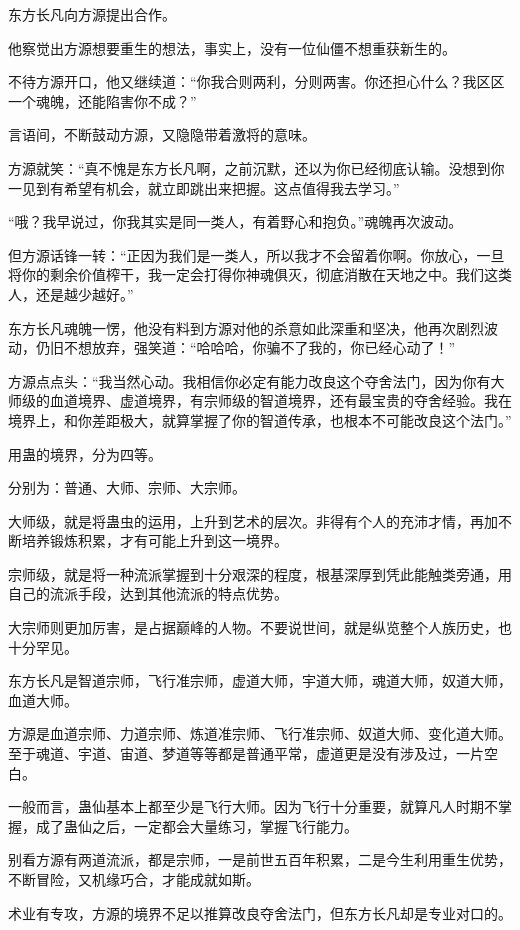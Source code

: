 \begin{this_body}
东方长凡向方源提出合作。

他察觉出方源想要重生的想法，事实上，没有一位仙僵不想重获新生的。

不待方源开口，他又继续道：“你我合则两利，分则两害。你还担心什么？我区区一个魂魄，还能陷害你不成？”

言语间，不断鼓动方源，又隐隐带着激将的意味。

方源就笑：“真不愧是东方长凡啊，之前沉默，还以为你已经彻底认输。没想到你一见到有希望有机会，就立即跳出来把握。这点值得我去学习。”

“哦？我早说过，你我其实是同一类人，有着野心和抱负。”魂魄再次波动。

但方源话锋一转：“正因为我们是一类人，所以我才不会留着你啊。你放心，一旦将你的剩余价值榨干，我一定会打得你神魂俱灭，彻底消散在天地之中。我们这类人，还是越少越好。”

东方长凡魂魄一愣，他没有料到方源对他的杀意如此深重和坚决，他再次剧烈波动，仍旧不想放弃，强笑道：“哈哈哈，你骗不了我的，你已经心动了！”

方源点点头：“我当然心动。我相信你必定有能力改良这个夺舍法门，因为你有大师级的血道境界、虚道境界，有宗师级的智道境界，还有最宝贵的夺舍经验。我在境界上，和你差距极大，就算掌握了你的智道传承，也根本不可能改良这个法门。”

用蛊的境界，分为四等。

分别为：普通、大师、宗师、大宗师。

大师级，就是将蛊虫的运用，上升到艺术的层次。非得有个人的充沛才情，再加不断培养锻炼积累，才有可能上升到这一境界。

宗师级，就是将一种流派掌握到十分艰深的程度，根基深厚到凭此能触类旁通，用自己的流派手段，达到其他流派的特点优势。

大宗师则更加厉害，是占据巅峰的人物。不要说世间，就是纵览整个人族历史，也十分罕见。

东方长凡是智道宗师，飞行准宗师，虚道大师，宇道大师，魂道大师，奴道大师，血道大师。

方源是血道宗师、力道宗师、炼道准宗师、飞行准宗师、奴道大师、变化道大师。至于魂道、宇道、宙道、梦道等等都是普通平常，虚道更是没有涉及过，一片空白。

一般而言，蛊仙基本上都至少是飞行大师。因为飞行十分重要，就算凡人时期不掌握，成了蛊仙之后，一定都会大量练习，掌握飞行能力。

别看方源有两道流派，都是宗师，一是前世五百年积累，二是今生利用重生优势，不断冒险，又机缘巧合，才能成就如斯。

术业有专攻，方源的境界不足以推算改良夺舍法门，但东方长凡却是专业对口的。


\end{this_body}
